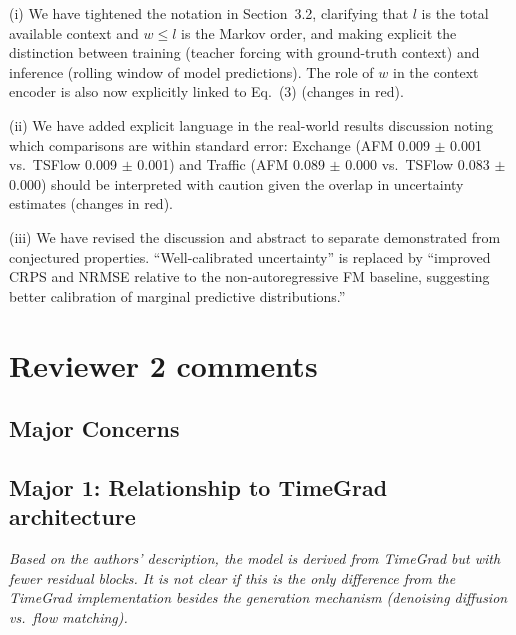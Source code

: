 \documentclass[11pt]{article}
\newcommand{\reviewertext}[1]{%
  \begin{reviewerquote}
    {\color{reviewercolor}\itshape #1}
  \end{reviewerquote}%
}
\newcommand{\authorresponse}[1]{%
    #1\par\medskip
}
\begin{document}
\authorresponse{%
(i) We have tightened the notation in Section~3.2, clarifying that $l$ is the total available context and $w \le l$ is the Markov order, and making explicit the distinction between training (teacher forcing with ground-truth context) and inference (rolling window of model predictions). The role of $w$ in the context encoder is also now explicitly linked to Eq.~(3) (changes in red).

(ii) We have added explicit language in the real-world results discussion noting which comparisons are within standard error: Exchange (AFM 0.009 $\pm$ 0.001 vs.\ TSFlow 0.009 $\pm$ 0.001) and Traffic (AFM 0.089 $\pm$ 0.000 vs.\ TSFlow 0.083 $\pm$ 0.000) should be interpreted with caution given the overlap in uncertainty estimates (changes in red).

(iii) We have revised the discussion and abstract to separate demonstrated from conjectured properties. ``Well-calibrated uncertainty'' is replaced by ``improved CRPS and NRMSE relative to the non-autoregressive FM baseline, suggesting better calibration of marginal predictive distributions.''

}


\section{Reviewer 2 comments}

\subsection{Major Concerns}

\subsection{Major 1: Relationship to TimeGrad architecture}

\reviewertext{%
Based on the authors' description, the model is derived from TimeGrad but with fewer residual blocks. It is not clear if this is the only difference from the TimeGrad implementation besides the generation mechanism (denoising diffusion vs.\ flow matching).
}
\end{document}
